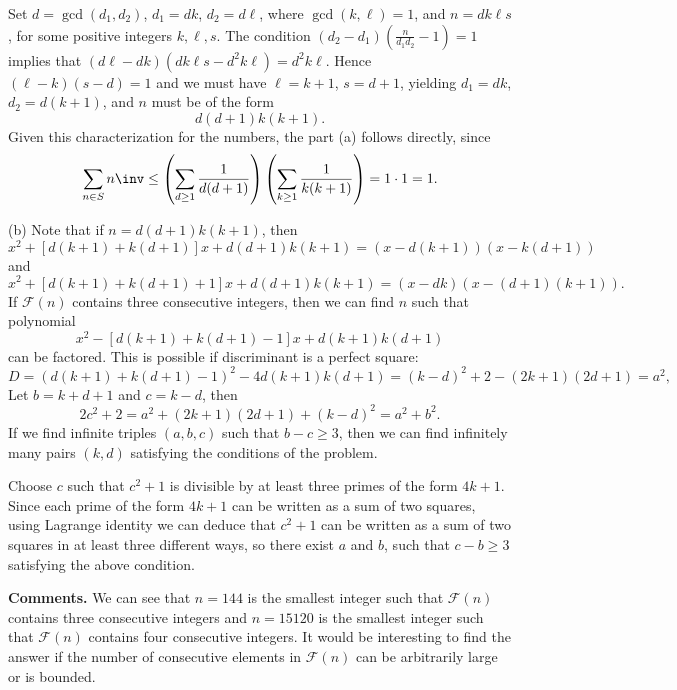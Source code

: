 Set $d=\gcd(d_1, d_2)$, $d_1=dk$, $d_2=d\ell$, where $\gcd(k,\ell)=1$, and $n=dk \ell s$, for some positive integers $k, \ell, s$.
The condition $(d_2-d_1)(\frac{n}{d_1d_2}-1)=1$ implies that $(d\ell - dk)(dk \ell s- d^2k\ell)=d^2 k \ell$.
Hence $(\ell -k)(s-d)=1$ and we must have $\ell=k+1$, $s=d+1$, yielding $d_1=dk$, $d_2=d(k+1)$, and $n$ must be of the form \[ d(d+1)k(k+1). \]
Given this characterization for the numbers,
the part (a) follows directly, since
\[ \sum_{n \in S} n\inv
  \le
  \left( \sum_{d \ge 1} \frac{1}{d(d+1)} \right)
  \left( \sum_{k \ge 1} \frac{1}{k(k+1)} \right)
  = 1 \cdot 1 = 1.
\]


(b) Note that if $n=d(d+1)k(k+1)$, then
\[x^2+[d(k+1)+k(d+1)]x+d(d+1)k(k+1)=(x-d(k+1))(x-k(d+1))\]
and
\[x^2+[d(k+1)+k(d+1)+1]x+d(d+1)k(k+1)=(x-dk)\left(x-(d+1)(k+1)\right).\]
If $\mathcal F(n)$ contains three consecutive integers, then we can find $n$ such that polynomial
\[
x^2 - [d(k+1)+k(d+1)-1]x+d(k+1)k(d+1)
\]
can be factored. This is possible if discriminant is a perfect square:
\[
D= (d(k+1)+k(d+1)-1)^2-4d(k+1)k(d+1)=(k-d)^2+2-(2k+1)(2d+1)=a^2,
\]
Let $b=k+d+1$ and $c=k-d$, then
\[
2c^2+2=a^2+(2k+1)(2d+1)+(k-d)^2=a^2+b^2.
\]
If we find infinite triples $(a, b, c)$ such that $b-c \geq 3$, then we can find infinitely many pairs $(k, d)$ satisfying the conditions
of the problem.

Choose $c$ such that $c^2+1$ is divisible by at least three primes of the form $4k+1$.
Since each prime of the form $4k+1$ can be written as a sum of two squares, using Lagrange identity
we can deduce that $c^2+1$ can be written as a sum of two squares in at least three different ways,
so there exist $a$ and $b$, such that $c-b \geq 3$ satisfying the above condition.

\textbf{Comments.} We can see that $n=144$ is the smallest integer such that $\mathcal F(n)$ contains three consecutive integers
and $n=15120$ is the smallest integer such that $\mathcal F(n)$ contains four consecutive integers.
It would be interesting to find the answer if the number of consecutive elements in $\mathcal F(n)$ can be arbitrarily large or is bounded.
